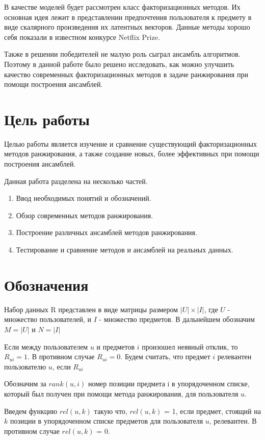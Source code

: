 \documentclass[a4paper,12pt]{article}
\begin{document}
В качестве моделей будет рассмотрен класс факторизационных методов. Их основная идея лежит в представлении предпочтения пользователя к предмету  в виде скалярного произведения их латентных векторов\cite{matrixfactorization}.  Данные методы хорошо себя показали в известном конкурсе Netflix Prize\cite{netflix}.

Также в решении победителей не малую роль сыграл ансамбль алгоритмов. Поэтому в данной работе было  решено исследовать, как можно улучшить качество современных факторизационных методов в задаче ранжирования при помощи  построения ансамблей. 

\section{Цель работы}
Целью работы является изучение и сравнение существующий факторизационных методов ранжирования, а также создание новых, более эффективных при помощи построения ансамблей. 


Данная работа  разделена на несколько частей.
\begin{enumerate}
\item Ввод необходимых понятий и обозначений.
\item Обзор современных методов ранжирования.
\item Построение различных ансамблей методов ранжирования.
\item Тестирование и сравнение методов и ансамблей на реальных данных.
\end{enumerate}


\section{Обозначения}

Набор данных R представлен в виде матрицы  размером $|U| \times |I|$, где $U$ - множество пользователей, и $I$ - множество предметов. В дальнейшем обозначим $M = |U| $ и $N = |I|$

Если между пользователем $u$ и предметов $i$ произошел неявный отклик, то $R_{ui}=1$. В противном случае $R_{ui} = 0$. Будем считать, что предмет $i$ релевантен пользователю $u$, если $R_{ui}$


Обозначим за $rank(u, i)$ номер позиции предмета i в упорядоченном списке, который был получен при помощи метода ранжирования, для пользователя $u$.   

Введем функцию $rel(u, k)$ такую что, $rel(u, k)$ = 1, если предмет, стоящий на $k$ позиции в упорядоченном списке предметов для пользователя $u$, релевантен. В противном случае $rel(u, k)$ = 0.  
\end{document}
